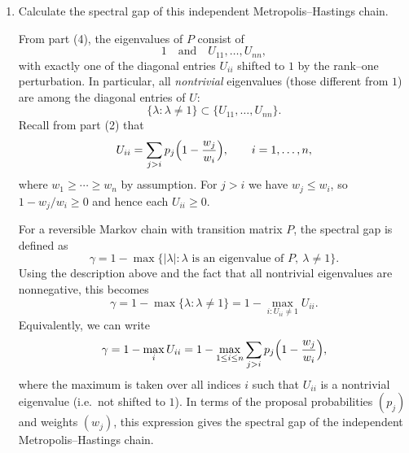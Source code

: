 \documentclass[answers,12pt,addpoints]{exam}
\begin{document}
\begin{enumerate}
\begin{solution}
We now apply the rank-one perturbation lemma from part (3) with
\[
A = U,\quad B = P = U + R,\quad u_n = {\bf 1},\quad u = p.
\]
The lemma states that $P$ has eigenvalues
\[
\lambda_1(U),\dots,\lambda_{n-1}(U),\ \lambda_n(U) + u^{\top}u_n,
\]
i.e.\ all but one of the eigenvalues of $U$ remain unchanged, and a single
eigenvalue is shifted by the amount $u^{\top}u_n$.

Because $P$ is a Markov transition matrix, it must have eigenvalue $1$ with
(right) eigenvector equal to the stationary distribution (up to scaling).
Hence the shifted eigenvalue
\[
\lambda_n(U) + u^{\top}u_n
\]
must be equal to $1$. The remaining eigenvalues of $P$ are exactly the
other diagonal entries of $U$:
\[
\lambda_i(P) = U_{ii},\qquad i = 1,\dots,n-1,
\]
up to a relabeling of indices. In particular, the full multiset of eigenvalues
of $P$ can be described as
\[
\{1\} \,\cup\, \{U_{11},\dots,U_{nn}\}\setminus\{\text{one diagonal entry
that is shifted to } 1\}.
\]
Equivalently, we may write: the eigenvalues of $P$ consist of $1$ together
with the diagonal entries of $U$, except for one diagonal entry that has been
shifted to $1$ by the rank-one perturbation.
    \end{solution}
    \item Calculate the spectral gap of this independent Metropolis--Hastings chain.
    \begin{solution}
From part (4), the eigenvalues of $P$ consist of
\[
1 \quad\text{and}\quad U_{11},\dots,U_{nn},
\]
with exactly one of the diagonal entries $U_{ii}$ shifted to $1$ by the
rank--one perturbation. In particular, all \emph{nontrivial} eigenvalues
(those different from $1$) are among the diagonal entries of $U$:
\[
\{\lambda : \lambda \neq 1\} \subset \{U_{11},\dots,U_{nn}\}.
\]
Recall from part (2) that
\[
U_{ii} = \sum_{j > i} p_j \Bigl(1 - \frac{w_j}{w_i}\Bigr),
\qquad i = 1,\dots,n,
\]
where $w_1 \ge \cdots \ge w_n$ by assumption. For $j>i$ we have
$w_j \le w_i$, so $1 - w_j/w_i \ge 0$ and hence each $U_{ii} \ge 0$.

For a reversible Markov chain with transition matrix $P$, the spectral gap
is defined as
\[
\gamma
= 1 - \max\{|\lambda| : \lambda \text{ is an eigenvalue of } P,\ \lambda \neq 1\}.
\]
Using the description above and the fact that all nontrivial eigenvalues are
nonnegative, this becomes
\[
\gamma
= 1 - \max\{\lambda : \lambda \neq 1\}
= 1 - \max_{i : U_{ii} \neq 1} U_{ii}.
\]
Equivalently, we can write
\[
\gamma
= 1 - \max_{i} U_{ii}
= 1 - \max_{1 \le i \le n}
      \sum_{j > i} p_j \Bigl(1 - \frac{w_j}{w_i}\Bigr),
\]
where the maximum is taken over all indices $i$ such that $U_{ii}$ is a
nontrivial eigenvalue (i.e.\ not shifted to $1$). In terms of the proposal
probabilities $(p_j)$ and weights $(w_j)$, this expression gives the spectral
gap of the independent Metropolis--Hastings chain.
    \end{solution}
\end{enumerate}
\end{document}
